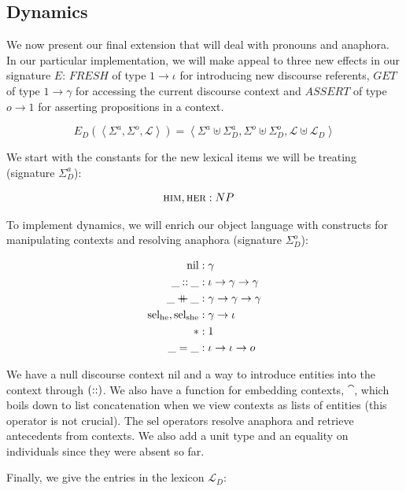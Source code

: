 \subsection{Dynamics}

We now present our final extension that will deal with pronouns and
anaphora. In our particular implementation, we will make appeal to three
new effects in our signature $E$: $FRESH$ of type $1 \to \iota$ for
introducing new discourse referents, $GET$ of type $1 \to \gamma$ for
accessing the current discourse context and $ASSERT$ of type $o \to 1$ for
asserting propositions in a context.

$$
E_D(\left< \Sigma^a, \Sigma^o, \mathcal{L} \right>) = \left< \Sigma^a \uplus \Sigma^a_D, \Sigma^o \uplus \Sigma^o_D, \mathcal{L} \uplus \mathcal{L}_D \right>
$$

We start with the constants for the new lexical items we will be treating
(signature $\Sigma^a_D$):

\begin{align*}
  \textsc{him}, \textsc{her} &: NP
\end{align*}

To implement dynamics, we will enrich our object language with constructs
for manipulating contexts and resolving anaphora (signature $\Sigma^o_D$):

\begin{align*}
  \mathrm{nil} &: \gamma \\
  \_ \mathbin{::} \_ &: \iota \to \gamma \to \gamma \\
  \_ \mathbin{+\mkern-10mu+} \_ &: \gamma \to \gamma \to \gamma \\
  \mathrm{sel_{he}}, \mathrm{sel_{she}}  &: \gamma \to \iota \\
  * &: 1 \\
  \_ = \_ &: \iota \to \iota \to o
\end{align*}

We have a null discourse context $\mathrm{nil}$ and a way to
introduce entities into the context through $(\mathbin{::})$. We also have a
function for embedding contexts, $\cat$, which boils down to list
concatenation when we view contexts as lists of entities (this operator is
not crucial). The $\mathrm{sel}$ operators resolve anaphora and
retrieve antecedents from contexts. We also add a unit type and an equality
on individuals since they were absent so far.

Finally, we give the entries in the lexicon $\mathcal{L}_D$:

